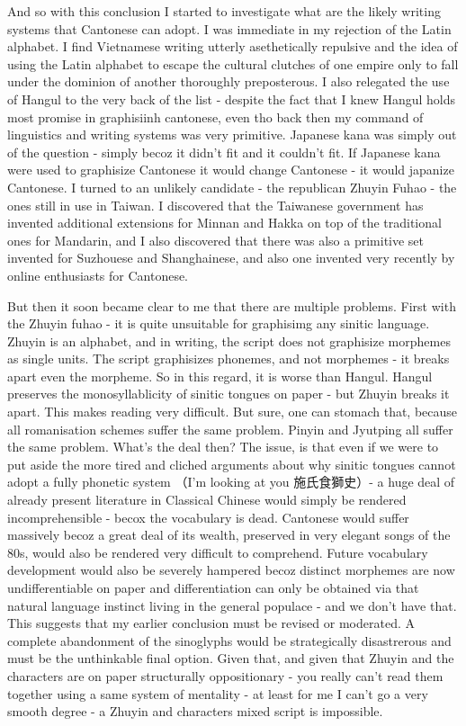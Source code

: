 \documentclass[a5paper, 10pt, openany]{book} %
\begin{document}
And so with this conclusion I started to investigate what are the likely writing systems that Cantonese can adopt. I was immediate in my rejection of the Latin alphabet. I find Vietnamese writing utterly asethetically repulsive and the idea of using the Latin alphabet to escape the cultural clutches of one empire only to fall under the dominion of another thoroughly preposterous. I also relegated the use of Hangul to the very back of the list - despite the fact that I knew Hangul holds most promise in graphisiinh cantonese, even tho back then my command of linguistics and writing systems was very primitive. Japanese kana was simply out of the question - simply becoz it didn't fit and it couldn't fit. If Japanese kana were used to graphisize Cantonese it would change Cantonese - it would japanize Cantonese. I turned to an unlikely candidate - the republican Zhuyin Fuhao - the ones still in use in Taiwan. I discovered that the Taiwanese government has invented additional extensions for Minnan and Hakka on top of the traditional ones for Mandarin, and I also discovered that there was also a primitive set invented for Suzhouese and Shanghainese, and also one invented very recently by online enthusiasts for Cantonese.

But then it soon became clear to me that there are multiple problems. First with the Zhuyin fuhao - it is quite unsuitable for graphisimg any sinitic language. Zhuyin is an alphabet, and in writing, the script does not graphisize morphemes as single units. The script graphisizes phonemes, and not morphemes - it breaks apart even the morpheme. So in this regard, it is worse than Hangul. Hangul preserves the monosyllablicity of sinitic tongues on paper - but Zhuyin breaks it apart. This makes reading very difficult. But sure, one can stomach that, because all romanisation schemes suffer the same problem. Pinyin and Jyutping all suffer the same problem. What's the deal then? The issue, is that even if we were to put aside the more tired and cliched arguments about why sinitic tongues cannot adopt a fully phonetic system （I'm looking at you 施氏食獅史）-  a huge deal of already present literature in Classical Chinese would simply be rendered incomprehensible - becox the vocabulary is dead. Cantonese would suffer massively becoz a great deal of its wealth, preserved in very elegant songs of the 80s, would also be rendered very difficult to comprehend. Future vocabulary development would also be severely hampered becoz distinct morphemes are now undifferentiable on paper and differentiation can only be obtained via that natural language instinct living in the general populace - and we don't have that. This suggests that my earlier conclusion must be revised or moderated. A complete abandonment of the sinoglyphs would be strategically disastrerous and must be the unthinkable final option. Given that, and given that Zhuyin and the characters are on paper structurally oppositionary - you really can't read them together using a same system of mentality - at least for me I can't go a very smooth degree - a Zhuyin and characters mixed script is impossible.
\end{document}
